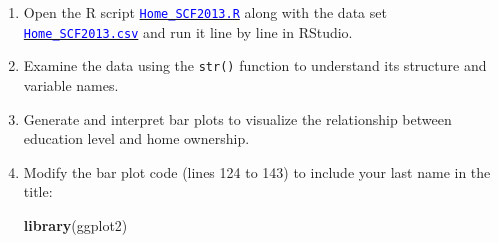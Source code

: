 \documentclass[oneside,openany]{book}
\newenvironment{Shaded}{\begin{snugshade}}{\end{snugshade}}
\newcommand{\FunctionTok}[1]{\textcolor[rgb]{0.13,0.29,0.53}{\textbf{#1}}}
\newcommand{\NormalTok}[1]{#1}
\begin{document}
\begin{enumerate}
\def\labelenumi{\arabic{enumi}.}
\item
  Open the R script \href{https://raw.githubusercontent.com/aslemand/Data-Analysis-Activities/main/data/Activity_1/Home_SCF2013.R}{\textcolor{blue}{\texttt{Home\_SCF2013.R}}} along with the data set \href{https://raw.githubusercontent.com/aslemand/Data-Analysis-Activities/main/data/Activity_1/Home_SCF2013.csv}{\textcolor{blue}{\texttt{Home\_SCF2013.csv}}} and run it line by line in RStudio.
\item
  Examine the data using the \texttt{str()} function to understand its structure and variable names.
\item
  Generate and interpret bar plots to visualize the relationship between education level and home ownership.
\item
  Modify the bar plot code (lines 124 to 143) to include your last name in the title:

\begin{Shaded}
\begin{Highlighting}[]
\FunctionTok{library}\NormalTok{(ggplot2)}


\end{Highlighting}
\end{Shaded}
\end{enumerate}
\end{document}
